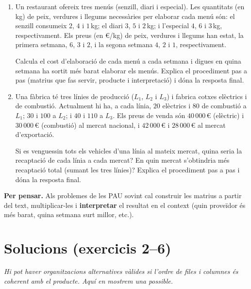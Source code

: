 \documentclass[12pt,a4paper]{article}
\newcommand{\blocInici}{%
  \par\nobreak\vspace{0pt}%
  \begin{minipage}[t]{\linewidth}%
}
\newcommand{\blocFi}{%
  \end{minipage}%
  \par
}
\begin{document}
\begin{enumerate}[leftmargin=*,itemsep=0.55em,parsep=0.2em]
\item
{}%
\blocInici
Un restaurant ofereix tres menús (senzill, diari i especial).
Les quantitats (en kg) de peix, verdures i llegums necessàries per elaborar cada menú són:
el senzill consumeix $2$, $4$ i $1$\,kg;
el diari $3$, $5$ i $2$\,kg;
i l'especial $4$, $6$ i $3$\,kg, respectivament.
Els preus (en \euro{}/kg) de peix, verdures i llegums han estat,
la primera setmana, $6$, $3$ i $2$,
i la segona setmana $4$, $2$ i $1$, respectivament.

Calcula el cost d'elaboració de cada menú a cada setmana
i digues en quina setmana ha sortit més barat elaborar els menús.
Explica el procediment pas a pas (matrius que fas servir, producte i interpretació)
i dóna la resposta final.
\blocFi

\item
{}%
\blocInici
Una fàbrica té tres línies de producció ($L_1$, $L_2$ i $L_3$)
i fabrica cotxes elèctrics i de combustió.
Actualment hi ha, a cada línia, $20$ elèctrics i $80$ de combustió a $L_1$;
$30$ i $100$ a $L_2$; i $40$ i $110$ a $L_3$.
Els preus de venda són $40\,000$\,\euro{} (elèctric) i $30\,000$\,\euro{} (combustió)
al mercat nacional, i $42\,000$\,\euro{} i $28\,000$\,\euro{} al mercat d'exportació.

Si es venguessin tots els vehicles d'una línia al mateix mercat,
quina seria la recaptació de cada línia a cada mercat?
En quin mercat s'obtindria més recaptació total (sumant les tres línies)?
Explica el procediment pas a pas i dóna la resposta final.
\blocFi

\end{enumerate}

\vspace{0.4em}
\begin{tcolorbox}[
  colback=white,
  colframe=margueVerdClar,
  boxrule=0.7pt,
  arc=2pt,
  left=5pt, right=5pt, top=3pt, bottom=3pt,
  fontupper=\small
]
\textbf{Per pensar.}
Als problemes de les PAU sovint cal construir les matrius a partir del text,
multiplicar-les i \textbf{interpretar} el resultat en el context
(quin proveïdor és més barat, quina setmana surt millor, etc.).
\end{tcolorbox}

\newpage
\section*{Solucions (exercicis 2--6)}
{\small\textit{Hi pot haver organitzacions alternatives vàlides si l'ordre de files i columnes
és coherent amb el producte. Aquí en mostrem una possible.}}
\end{document}
